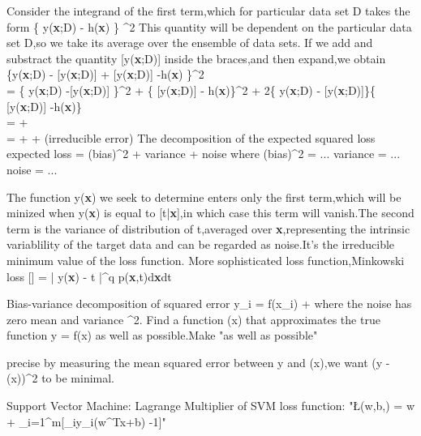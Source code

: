 Consider the integrand of the first term,which for particular data set D takes the form
  \{ y(\textbf{x};D) - h(\textbf{x}) \} ^2
This quantity will be dependent on the particular data set D,so we take its average over the ensemble of data sets.
If we add and substract the quantity [y(\textbf{x};D)] inside the braces,and then expand,we obtain
\{y(\textbf{x};D) - [y(\textbf{x};D)] + [y(\textbf{x};D)] -h(\textbf{x})  \}^2         \\
= \{ y(\textbf{x};D) -[y(\textbf{x};D)]    \}^2 + \{ [y(\textbf{x};D)] - h(\textbf{x})\}^2 +
  2\{ y(\textbf{x};D) - [y(\textbf{x};D)]\}\{ [y(\textbf{x};D)] -h(\textbf{x})\} \\
=  +    \\
=                    \color{red}{variance}                 +   \color{blue}{(bias)^2}  + (irreducible error)
The decomposition of the expected squared loss
                                  expected loss = (bias)^2 + variance + noise
where
                                  (bias)^2 = ...
                                  variance = ...
                                  noise = ...
  
The function y(\textbf{x}) we seek to determine enters only the first term,which will be minized when y(\textbf{x}) 
is equal to [t|\textbf{x}],in which case this term will vanish.The second term is the variance of 
distribution of t,averaged over \textbf{x},representing the intrinsic variablility of the target data and can be 
regarded as noise.It's the irreducible minimum value of the loss function.
More sophisticated loss function,Minkowski loss
[] = \int\int| y(\textbf{x}) - t |^q p(\textbf{x},t)d\textbf{x}dt




Bias-variance decomposition of squared error
                                  y_i = f(x_i) + \epsilon 
where the noise \epsilon has zero mean and variance \sigma^2.
Find a function (x) that approximates the true function y = f(x) as well as possible.Make "as well as possible"

precise  by measuring the mean squared error between y and (x),we want (y - (x))^2 to be minimal.










Support Vector Machine:
Lagrange Multiplier of SVM loss function:
"\L(w,b,\alpha) = \parallel \mathbf w \parallel + \sum_{i=1}^{m}[\alpha_iy_i(\mathbf w^Tx+b) -1]"
